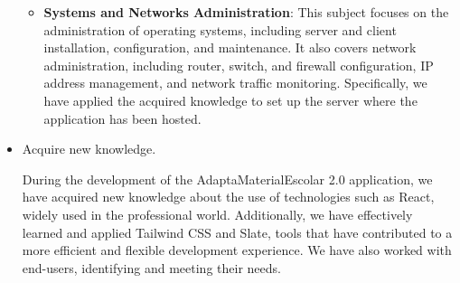 \begin{itemize}
\begin{itemize}
        \item \textbf{Systems and Networks Administration}: This subject focuses on the administration of operating systems, including server and client installation, configuration, and maintenance. It also covers network administration, including router, switch, and firewall configuration, IP address management, and network traffic monitoring. Specifically, we have applied the acquired knowledge to set up the server where the application has been hosted.
    \end{itemize}

    \item Acquire new knowledge.

    During the development of the AdaptaMaterialEscolar 2.0 application, we have acquired new knowledge about the use of technologies such as React, widely used in the professional world. Additionally, we have effectively learned and applied Tailwind CSS and Slate, tools that have contributed to a more efficient and flexible development experience. We have also worked with end-users, identifying and meeting their needs.
\end{itemize}


